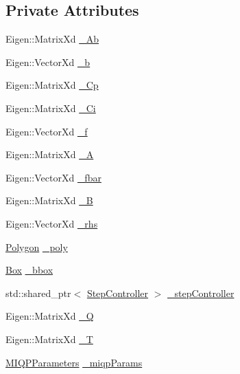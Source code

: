 \subsection*{\-Private \-Attributes}
\begin{DoxyCompactItemize}
\item 
\-Eigen\-::\-Matrix\-Xd \hyperlink{classBaseOfSupport_a42d531cd89c34cf8821c5cdeff321bc1}{\-\_\-\-Ab}
\item 
\-Eigen\-::\-Vector\-Xd \hyperlink{classBaseOfSupport_a9a77c3e98a73065f60b99e888c50fcc7}{\-\_\-b}
\item 
\-Eigen\-::\-Matrix\-Xd \hyperlink{classBaseOfSupport_a0ff0fd44966f86d5a62e4d38c3cfea60}{\-\_\-\-Cp}
\item 
\-Eigen\-::\-Matrix\-Xd \hyperlink{classBaseOfSupport_a0a7a51d0d278841633e4b291df96065d}{\-\_\-\-Ci}
\item 
\-Eigen\-::\-Vector\-Xd \hyperlink{classBaseOfSupport_aa2d0af7272d153ead5e088ff67c981e8}{\-\_\-f}
\item 
\-Eigen\-::\-Matrix\-Xd \hyperlink{classBaseOfSupport_a54a35d087a8dfaee9a27d025d46f706d}{\-\_\-\-A}
\item 
\-Eigen\-::\-Vector\-Xd \hyperlink{classBaseOfSupport_aa578314a7473867f545b95883beb6c6b}{\-\_\-fbar}
\item 
\-Eigen\-::\-Matrix\-Xd \hyperlink{classBaseOfSupport_a8dd3c63ff193e5722c93307a952178a8}{\-\_\-\-B}
\item 
\-Eigen\-::\-Vector\-Xd \hyperlink{classBaseOfSupport_a274325bb39f10aac06153b82a2541c3b}{\-\_\-rhs}
\item 
\hyperlink{BaseOfSupport_8h_a3b0bf53b9d321e300a59729ebe10e02c}{\-Polygon} \hyperlink{classBaseOfSupport_a7e9b4ef515f90e2a7012871e7287bf5e}{\-\_\-poly}
\item 
\hyperlink{BaseOfSupport_8h_ac470b50f15f04405e67b9031615134f0}{\-Box} \hyperlink{classBaseOfSupport_a8af13ff0086dc08252d49f69b1752033}{\-\_\-bbox}
\item 
std\-::shared\-\_\-ptr$<$ \hyperlink{classStepController}{\-Step\-Controller} $>$ \hyperlink{classBaseOfSupport_a023d28c6900f0e97d9de42ca2c5d94a5}{\-\_\-step\-Controller}
\item 
\-Eigen\-::\-Matrix\-Xd \hyperlink{classBaseOfSupport_a22efc7f81862ffd1268b862ddb9d59ff}{\-\_\-\-Q}
\item 
\-Eigen\-::\-Matrix\-Xd \hyperlink{classBaseOfSupport_a52f07f15e1667eb7876e614dcd817ef1}{\-\_\-\-T}
\item 
\hyperlink{structMIQPParameters}{\-M\-I\-Q\-P\-Parameters} \hyperlink{classBaseOfSupport_a82f86511c236d038f1670dd515e53a8f}{\-\_\-miqp\-Params}
\end{DoxyCompactItemize}


